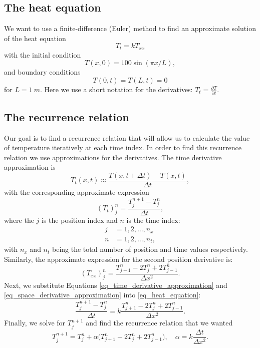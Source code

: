 \subsection{The heat equation}

We want to use a finite-difference (Euler) method to find an approximate solution of the heat equation
\begin{equation}
  T_t = k T_{xx}
  \label{eq_heat_equation}
\end{equation}
with the initial condition
\begin{equation}
  T(x,0) = 100 \sin(\pi x / L),
  \label{eq_initial_condition}
\end{equation}
and boundary conditions
\begin{equation}
  T(0,t) = T(L,t) = 0
  \label{eq_boundary_conditions}
\end{equation}
for $L = 1 \ m$. Here we use a short notation for the derivatives: $T_t = \frac{\partial T}{\partial t}$.


\subsection{The recurrence relation}

Our goal is to find a recurrence relation that will allow us to calculate the value of temperature iteratively at each time index. In order to find this recurrence relation we use approximations for the derivatives. The time derivative approximation is
\[
  T_t(x, t) \approx \frac{T(x, t + \Delta t) - T(x, t)}{\Delta t},
\]
with the corresponding approximate expression
\begin{equation}
  (T_t)_j^n = \frac{T_j^{n + 1} - T_j^{n}}{\Delta t},
  \label{eq_time_derivative_approximation}
\end{equation}
where the $j$ is the position index and $n$ is the time index:
\begin{align*}
  j &= 1, 2, \dots, n_x \\
  n &= 1, 2, \dots, n_t,
\end{align*}
with $n_x$ and $n_t$ being the total number of position and time values respectively.
Similarly, the approximate expression for the second position derivative is:
\begin{equation}
  (T_{xx})_j^n = \frac{T_{j+1}^n - 2 T_{j}^n + 2T_{j-1}^n}{\Delta x^2}.
  \label{eq_space_derivative_approximation}
\end{equation}
Next, we substitute Equations \ref{eq_time_derivative_approximation} and \ref{eq_space_derivative_approximation} into \autoref{eq_heat_equation}:
\[
  \frac{T_j^{n + 1} - T_j^{n}}{\Delta t} = k \frac{T_{j+1}^n - 2 T_{j}^n + 2T_{j-1}^n}{\Delta x^2}.
\]
Finally, we solve for $T_j^{n + 1}$ and find the recurrence relation that we wanted
\begin{equation}
  \boxed{ T_j^{n + 1} = T_j^{n} + \alpha \big( T_{j+1}^n - 2 T_{j}^n + 2T_{j-1}^n \big), \quad \alpha = k \frac{\Delta t}{\Delta x^2}. }
  \label{eq_recurrence_relation_heat_eq}
\end{equation}


